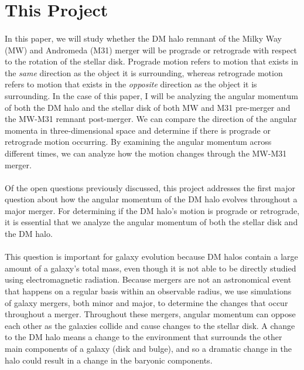 \documentclass[fleqn,usenatbib]{mnras}
\begin{document}
\section{This Project}

\paragraph{} In this paper, we will study whether the DM halo remnant of the Milky Way (MW) and Andromeda (M31) merger will be prograde or retrograde with respect to the rotation of the stellar disk. Prograde motion refers to motion that exists in the \textit{same} direction as the object it is surrounding, whereas retrograde motion refers to motion that exists in the \textit{opposite} direction as the object it is surrounding. In the case of this paper, I will be analyzing the angular momentum of both the DM halo and the stellar disk of both MW and M31 pre-merger and the MW-M31 remnant post-merger. We can compare the direction of the angular momenta in three-dimensional space and determine if there is prograde or retrograde motion occurring. By examining the angular momentum across different times, we can analyze how the motion changes through the MW-M31 merger.

\paragraph{} Of the open questions previously discussed, this project addresses the first major question about how the angular momentum of the DM halo evolves throughout a major merger. For determining if the DM halo's motion is prograde or retrograde, it is essential that we analyze the angular momentum of both the stellar disk and the DM halo.

\paragraph{} This question is important for galaxy evolution because DM halos contain a large amount of a galaxy's total mass, even though it is not able to be directly studied using electromagnetic radiation. Because mergers are not an astronomical event that happens on a regular basis within an observable radius, we use simulations of galaxy mergers, both minor and major, to determine the changes that occur throughout a merger. Throughout these mergers, angular momentum can oppose each other as the galaxies collide and cause changes to the stellar disk. A change to the DM halo means a change to the environment that surrounds the other main components of a galaxy (disk and bulge), and so a dramatic change in the halo could result in a change in the baryonic components.
\end{document}
